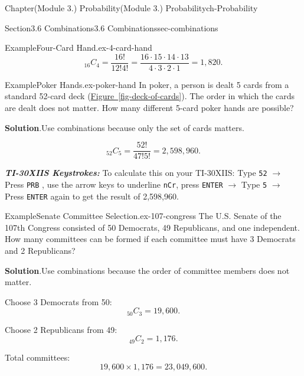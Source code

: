 \documentclass[oneside,10pt,]{book}
\newcommand{\blocktitlefont}{\relax}
\newcommand{\xreffont}{\relax}
\newcommand{\mono}[1]{\texttt{#1}}
\newcommand{\alert}[1]{\textbf{\textit{#1}}}
\begin{document}
\begin{chapterptx}{Chapter}{(Module 3.) Probability}{}{(Module 3.) Probability}{}{}{ch-Probability}
\begin{sectionptx}{Section}{3.6 Combinations}{}{3.6 Combinations}{}{}{sec-combinations}
\begin{example}{Example}{Four-Card Hand.}{ex-4-card-hand}
%
\begin{equation*}
{}_{16} C_4 = \frac{16!}{12!4!} = \frac{16 \cdot 15 \cdot 14 \cdot 13}{4 \cdot 3 \cdot 2 \cdot 1} = 1,820.
\end{equation*}
%
\end{example}
\begin{example}{Example}{Poker Hands.}{ex-poker-hand}%
In poker, a person is dealt 5 cards from a standard 52-card deck (\hyperref[fig-deck-of-cards]{Figure~{\xreffont\ref{fig-deck-of-cards}}}). The order in which the cards are dealt does not matter. How many different 5-card poker hands are possible?%
\par\smallskip%
\noindent\textbf{\blocktitlefont Solution}.\hypertarget{ex-poker-hand-3}{}\quad{}Use combinations because only the set of cards matters.%
\par
%
\begin{equation*}
{}_{52} C_5 = \frac{52!}{47!5!} = 2,598,960.
\end{equation*}
%
\par
\alert{TI-30XIIS Keystrokes:} To calculate this on your TI-30XIIS: Type \mono{52} \(\rightarrow\) Press \mono{PRB} , use the arrow keys to underline \mono{nCr}, press \mono{ENTER} \(\rightarrow\) Type \mono{5} \(\rightarrow\) Press \mono{ENTER} again to get the result of 2,598,960.%
\end{example}
\begin{example}{Example}{Senate Committee Selection.}{ex-107-congress}%
The U.S. Senate of the 107th Congress consisted of 50 Democrats, 49 Republicans, and one independent. How many committees can be formed if each committee must have 3 Democrats and 2 Republicans?%
\par\smallskip%
\noindent\textbf{\blocktitlefont Solution}.\hypertarget{ex-107-congress-3}{}\quad{}Use combinations because the order of committee members does not matter.%
\par
Choose 3 Democrats from 50:%
\begin{equation*}
{}_{50} C_3 = 19,600\text{.}
\end{equation*}
%
\par
Choose 2 Republicans from 49:%
\begin{equation*}
{}_{49} C_2 = 1,176\text{.}
\end{equation*}
%
\par
Total committees:%
\begin{equation*}
19,600 \times 1,176 = 23,049,600.
\end{equation*}
%
\par

\end{example}
\end{sectionptx}
\end{chapterptx}
\end{document}
